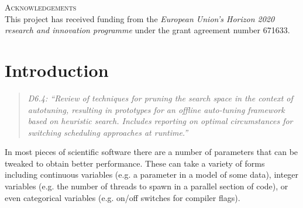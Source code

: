 \documentclass[a4paper,12pt]{article}
\begin{document}
\vspace{2em}





\noindent
\textsc{Acknowledgements}\\[1em]
This project has received funding from the \emph{European Union's Horizon 2020 research and innovation programme} under the grant agreement number 671633.





%

\newpage

\renewcommand{\contentsname}{Table of Contents}
\tableofcontents

\listoffigures



\newpage

%

\section{Introduction}
\label{sec.introduction}
\begin{quotation}
  \emph{D6.4:
    ``Review of techniques for pruning the search space in the context
    of autotuning, resulting in prototypes for an offline auto-tuning
    framework based on heuristic search.
    Includes reporting on optimal circumstances for switching
    scheduling
    approaches at runtime.''
  }
\end{quotation}

In most pieces of scientific software there are a number of parameters
that can be tweaked to obtain better performance.  These can take a
variety of forms including continuous variables (e.g. a parameter in a
model of some data), integer variables (e.g. the number of threads to
spawn in a parallel section of code), or even categorical variables
(e.g. on/off switches for compiler flags).
\end{document}
